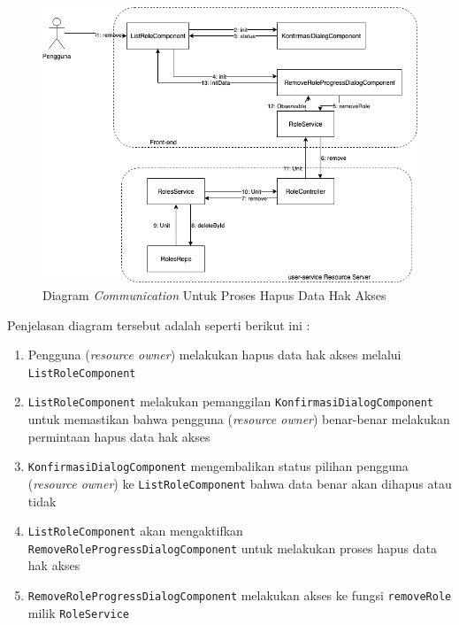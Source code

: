 \documentclass[pdftex,12pt, oneside]{article}
\begin{document}
\begin{itemize}
	\begin{figure}[H]
		\centering
		\includegraphics[width=1\textwidth]{./resources/comm-dia-remove-role}
		\caption{Diagram \textit{Communication} Untuk Proses Hapus Data Hak Akses}
		\label{fig:comm-dia-remove-role}
	\end{figure}
	
	Penjelasan diagram tersebut adalah seperti berikut ini :
	
	\begin{enumerate}
		\item Pengguna (\textit{resource owner}) melakukan hapus data hak akses melalui \texttt{ListRoleComponent}
		
		\item \texttt{ListRoleComponent} melakukan pemanggilan \texttt{KonfirmasiDialogComponent} untuk memastikan bahwa pengguna (\textit{resource owner}) benar-benar melakukan permintaan hapus data hak akses
		
		\item \texttt{KonfirmasiDialogComponent} mengembalikan status pilihan pengguna (\textit{resource owner}) ke \texttt{ListRoleComponent} bahwa data benar akan dihapus atau tidak
		
		\item \texttt{ListRoleComponent} akan mengaktifkan \texttt{RemoveRoleProgressDialogComponent} untuk melakukan proses hapus data hak akses
		
		\item \texttt{RemoveRoleProgressDialogComponent} melakukan akses ke fungsi \texttt{removeRole} milik \texttt{RoleService}
		

\end{enumerate}
\end{itemize}
\end{document}
